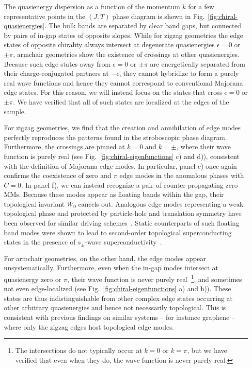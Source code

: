\documentclass[aps,prb,twocolumn,superscriptaddress,groupedaddress]{revtex4}
\begin{document}
The quasienergy dispersion as a function of the momentum $k$ for a few representative points in the $(J,T)$ phase diagram is shown in Fig.~\ref{fig:chiral-quasienergies}.
The bulk bands are separated by clear band gaps, but connected by pairs of in-gap states of opposite slopes.
While for zigzag geometries the edge states of opposite chirality always intersect at degenerate quasienergies $\epsilon=0$ or $\pm\pi$, armchair geometries show the existence of crossings at other quasienergies.
Because such edge states away from $\epsilon=0$ or $\pm\pi$ are energetically separated from their charge-conjugated partners at $-\epsilon$, they cannot hybridize to form a purely real wave functions and hence they cannot correspond to conventional Majorana edge states.
For this reason, we will instead focus on the states that cross $\epsilon=0$ or $\pm\pi$.
We have verified that all of such states are localized at the edges of the sample.

For zigzag geometries, we find that the creation and annihilation of edge modes perfectly reproduces the patterns found in the stroboscopic phase diagram.
Furthermore, the crossings are pinned at $k=0$ and $k=\pm$, where their wave function is purely real (see Fig.~\ref{fig:chiral-eigenfunctions} c) and d)), consistent with the definition of Majorana edge modes.
In particular, panel e) once again confirms the coexistence of zero and $\pi$ edge modes in the anomalous phases with $C=0$.
In panel f), we can instead recognize a pair of counter-propagating zero MMs.
Because these modes appear as floating bands within the gap, their topological invariant $W_0$ cancels out.
Analogous edge modes representing a weak topological phase and protected by particle-hole and translation symmetry have been observed for similar driving schemes~\cite{Fulga:2019}.
Static counterparts of such floating band modes were shown to lead to second-order topological superconducting states in the presence of $s_{\pm}$-wave superconductivity~\cite{Yan:2020}.

For armchair geometries, on the other hand, the edge modes appear unsystematically.
Furthermore, even when the in-gap modes intersect at quasienergy zero or $\pi$, their wave function is never purely real~\footnote{The intersections do not typically occur at $k=0$ or $k=\pi$, but we have verified that even when they do, the wave function is never purely real.}, and sometimes not even edge-localized (see Fig.~\ref{fig:chiral-eigenfunctions} a) and b)).
These states are thus indistinguishable from other complex edge states occurring at other arbitrary quasienergies and hence not necessarily topological. 
This is consistent with previous findings on similar systems -- for instance graphene -- where only the zigzag edges host topological edge modes. 
\end{document}
